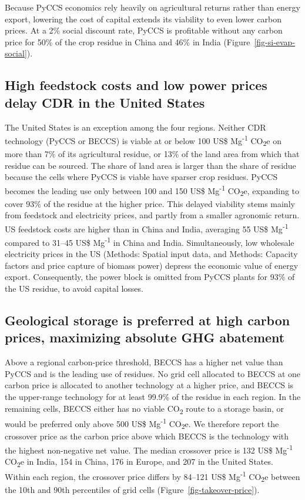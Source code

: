 \documentclass[
  letterpaper,
  twoside,
  twocolumn,
  9pt]{article}
\begin{document}
Because PyCCS economics rely heavily on agricultural returns rather than
energy export, lowering the cost of capital extends its viability to
even lower carbon prices. At a 2\% social discount
rate,\citep{drupp2018} PyCCS is profitable without any carbon price for
50\% of the crop residue in China and 46\% in India
(Figure~\ref{fig-si-evap-social}).

\subsection{High feedstock costs and low power prices delay CDR in the
United
States}\label{high-feedstock-costs-and-low-power-prices-delay-cdr-in-the-united-states}

The United States is an exception among the four regions. Neither CDR
technology (PyCCS or BECCS) is viable at or below 100 US\$
Mg\textsuperscript{-1} CO\textsubscript{2}e on more than 7\% of its
agricultural residue, or 13\% of the land area from which that residue
can be sourced. The share of land area is larger than the share of
residue because the cells where PyCCS is viable have sparser crop
residues. PyCCS becomes the leading use only between 100 and 150 US\$
Mg\textsuperscript{-1} CO\textsubscript{2}e, expanding to cover 93\% of
the residue at the higher price. This delayed viability stems mainly
from feedstock and electricity prices, and partly from a smaller
agronomic return. US feedstock costs are higher than in China and India,
averaging 55 US\$ Mg\textsuperscript{-1} compared to 31--45 US\$
Mg\textsuperscript{-1} in China and India. Simultaneously, low wholesale
electricity prices in the US (Methods: Spatial input data, and Methods:
Capacity factors and price capture of biomass power) depress the
economic value of energy export. Consequently, the power block is
omitted from PyCCS plants for 93\% of the US residue, to avoid capital
losses.

\subsection{Geological storage is preferred at high carbon prices,
maximizing absolute GHG
abatement}\label{geological-storage-is-preferred-at-high-carbon-prices-maximizing-absolute-ghg-abatement}

Above a regional carbon-price threshold, BECCS has a higher net value
than PyCCS and is the leading use of residues. No grid cell allocated to
BECCS at one carbon price is allocated to another technology at a higher
price, and BECCS is the upper-range technology for at least 99.9\% of
the residue in each region. In the remaining cells, BECCS either has no
viable CO\textsubscript{2} route to a storage basin, or would be
preferred only above 500 US\$ Mg\textsuperscript{-1}
CO\textsubscript{2}e. We therefore report the crossover price as the
carbon price above which BECCS is the technology with the highest
non-negative net value. The median crossover price is 132 US\$
Mg\textsuperscript{-1} CO\textsubscript{2}e in India, 154 in China, 176
in Europe, and 207 in the United States. Within each region, the
crossover price differs by 84--121 US\$ Mg\textsuperscript{-1}
CO\textsubscript{2}e between the 10th and 90th percentiles of grid cells
(Figure~\ref{fig-takeover-price}).
\end{document}
